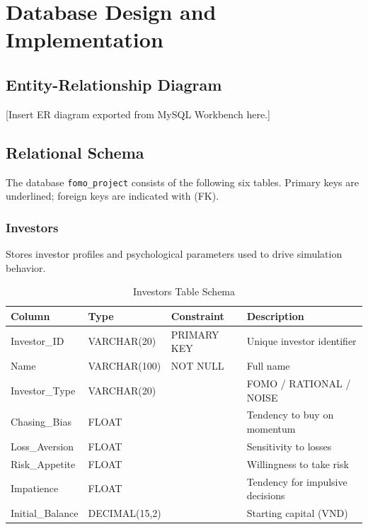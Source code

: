 \chapter{Database Design and Implementation}
\label{chap:dbdesign}

\section{Entity-Relationship Diagram}


[Insert ER diagram exported from MySQL Workbench here.]

\section{Relational Schema}

The database \texttt{fomo\_project} consists of the following six tables. Primary keys are underlined; foreign keys are indicated with (FK).

\subsection{Investors}

Stores investor profiles and psychological parameters used to drive simulation behavior.

\begin{table}[H]
    \centering
    \caption{Investors Table Schema}
    \begin{tabular}{llll}
        \toprule
        \textbf{Column} & \textbf{Type} & \textbf{Constraint} & \textbf{Description} \\
        \midrule
        Investor\_ID & VARCHAR(20) & PRIMARY KEY & Unique investor identifier \\
        Name & VARCHAR(100) & NOT NULL & Full name \\
        Investor\_Type & VARCHAR(20) & & FOMO / RATIONAL / NOISE \\
        Chasing\_Bias & FLOAT & & Tendency to buy on momentum \\
        Loss\_Aversion & FLOAT & & Sensitivity to losses \\
        Risk\_Appetite & FLOAT & & Willingness to take risk \\
        Impatience & FLOAT & & Tendency for impulsive decisions \\
        Initial\_Balance & DECIMAL(15,2) & & Starting capital (VND) \\
        \bottomrule
    \end{tabular}
\end{table}

